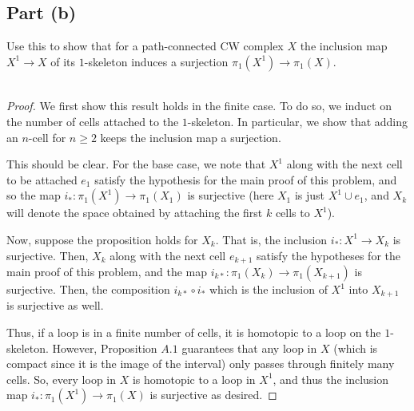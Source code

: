 \documentclass[fontsize=11pt]{scrartcl} %
\numberwithin{equation}{section} %
\numberwithin{figure}{section} %
\numberwithin{table}{section} %
\begin{document}
\subsection*{Part (b)}
Use this to show that for a path-connected CW complex $X$ the inclusion map
$X^1\to X$ of its $1$-skeleton induces a surjection $\pi_1(X^1)\to\pi_1(X)$.
\\
\\
\begin{proof}
    We first show this result holds in the finite case. To do so, we induct on
    the number of cells attached to the $1$-skeleton. In particular, we show
    that adding an $n$-cell for $n\geq 2$ keeps the inclusion map a surjection.

    This should be clear. For the base case, we note that $X^1$ along with the
    next cell to be attached $e_1$ satisfy the hypothesis for the main proof of
    this problem, and so the map $i_*:\pi_1(X^1)\to\pi_1(X_1)$ is surjective
    (here $X_1$ is just $X^1\cup e_1$, and $X_k$ will denote the space obtained
    by attaching the first $k$ cells to $X^1$).

    Now, suppose the proposition holds for $X_k$. That is, the inclusion
    $i_*:X^1\to X_k$ is surjective. Then, $X_k$ along with the
    next cell $e_{k+1}$ satisfy the hypotheses for the main proof of this
    problem, and the map $i_{k*}:\pi_1(X_k)\to \pi_1(X_{k+1})$ is surjective.
    Then, the composition $i_{k*}\circ i_*$ which is the inclusion of $X^1$ into
    $X_{k+1}$ is surjective as well.

    Thus, if a loop is in a finite number of cells, it is homotopic to a loop on
    the $1$-skeleton. However, Proposition $A.1$ guarantees that any loop in $X$
    (which is compact since it is the image of the interval) only passes through
    finitely many cells. So, every loop in $X$ is homotopic to a loop in $X^1$,
    and thus the inclusion map $i_*:\pi_1(X^1)\to \pi_1(X)$ is surjective as
    desired.
\end{proof}

\newpage
\end{document}
